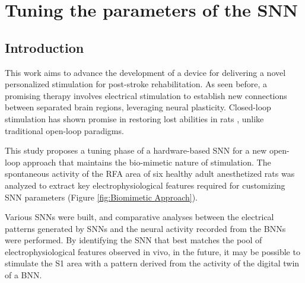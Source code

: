 \chapter[Tuning the parameters of the SNN]{Tuning the parameters of the SNN\raisebox{.15\baselineskip}{\Large\footnotemark}}

\section{Introduction}

This work aims to advance the development of a device for delivering a novel personalized stimulation for post-stroke rehabilitation. As seen before, a promising therapy involves electrical stimulation to establish new connections between separated brain regions, leveraging neural plasticity. Closed-loop stimulation has shown promise in restoring lost abilities in rats \cite{Guggenmos2013,Averna2020,Averna2021}, unlike traditional open-loop paradigms.

This study proposes a tuning phase of a hardware-based SNN \cite{Beaubois2023} for a new open-loop approach that maintains the bio-mimetic nature of stimulation. The spontaneous activity of the RFA area of six healthy adult anesthetized rats was analyzed to extract key electrophysiological features required for customizing SNN parameters (Figure \ref{fig:Biomimetic Approach}).

Various SNNs were built, and comparative analyses between the electrical patterns generated by SNNs and the neural activity recorded from the BNNs were performed. By identifying the SNN that best matches the pool of electrophysiological features observed in vivo, in the future, it may be possible to stimulate the S1 area with a pattern derived from the activity of the digital twin of a BNN.

